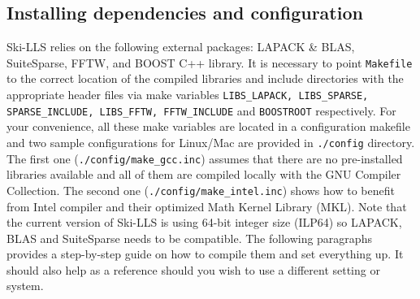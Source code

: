 \documentclass[english,11pt]{article}
\begin{document}
\subsection{Installing dependencies and configuration}
Ski-LLS relies on the following external packages: LAPACK \& BLAS, SuiteSparse, FFTW, and BOOST C++ library. It is necessary to point {\tt Makefile} to the correct location of the compiled libraries and include directories with the appropriate header files via make variables {\tt LIBS_LAPACK, LIBS_SPARSE, SPARSE_INCLUDE, LIBS_FFTW, FFTW_INCLUDE} and {\tt BOOSTROOT} respectively. For your convenience, all these make variables are located in a configuration makefile and two sample configurations for Linux/Mac are provided in {\tt ./config} directory. The first one ({\tt ./config/make_gcc.inc}) assumes that there are no pre-installed libraries available and all of them are compiled locally with the GNU Compiler Collection. The second one ({\tt ./config/make_intel.inc}) shows how to benefit from Intel compiler and their optimized Math Kernel Library (MKL). Note that the current version of Ski-LLS is using 64-bit integer size (ILP64) so LAPACK, BLAS and SuiteSparse needs to be compatible. The following paragraphs provides a step-by-step guide on how to compile them and set everything up. It should also help as a reference should you wish to use a different setting or system.
\end{document}
